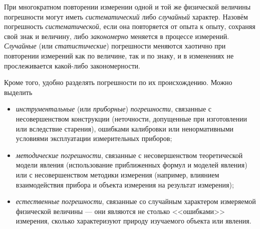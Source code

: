 
При многократном повторении измерении одной и той же физической величины
погрешности могут иметь \emph{систематический} либо \emph{случайный}
характер. Назовём погрешность \emph{систематической}, если она повторяется
от опыта к опыту, сохраняя свой знак и величину, либо \emph{закономерно}
меняется в процессе измерений. \emph{Случайные} (или \emph{статистические})
погрешности меняются хаотично при повторении измерений как по величине,
так и по знаку, и в изменениях не прослеживается какой-либо закономерности.

Кроме того, удобно разделять погрешности по их происхождению. Можно
выделить
\begin{itemize}
    \item \emph{инструментальные} (или \emph{приборные}) \emph{погрешности},
связанные с несовершенством конструкции (неточности, допущенные при
изготовлении или вследствие старения), ошибками калибровки или ненормативными
условиями эксплуатации измерительных приборов;
    \item \emph{методические} \emph{погрешности}, связанные с несовершенством
теоретической модели явления (использование приближенных формул и
моделей явления) или с несовершенством методики измерения (например,
влиянием взаимодействия прибора и объекта измерения на результат измерения);
    \item \emph{естественные} \emph{погрешности}, связанные со случайным
характером
измеряемой физической величины --- они являются не столько
<<ошибками>> измерения, сколько характеризуют
природу изучаемого объекта или явления.
\end{itemize}


